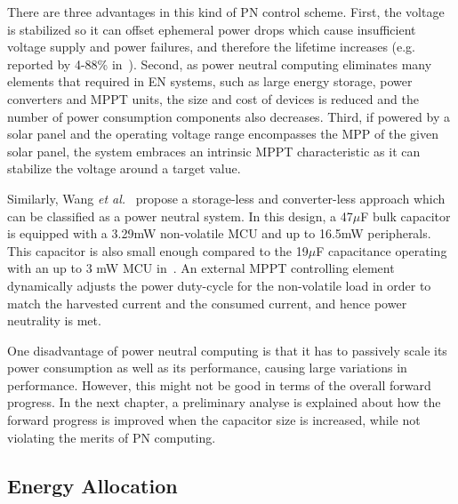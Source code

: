 There are three advantages in this kind of PN control scheme. First, the voltage is stabilized so it can offset ephemeral power drops which cause insufficient voltage supply and power failures, and therefore the lifetime increases (e.g. reported by 4-88\% in~\cite{balsamo2016graceful}). Second, as power neutral computing eliminates many elements that required in EN systems, such as large energy storage, power converters and MPPT units, the size and cost of devices is reduced and the number of power consumption components also decreases. Third, if powered by a solar panel and the operating voltage range encompasses the MPP of the given solar panel, the system embraces an intrinsic MPPT characteristic as it can stabilize the voltage around a target value.

Similarly, Wang \textit{et al.}~\cite{wang2016storage} propose a storage-less and converter-less approach which can be classified as a power neutral system. In this design, a 47$\mu$F bulk capacitor is equipped with a 3.29mW non-volatile MCU and up to 16.5mW peripherals. This capacitor is also small enough compared to the 19$\mu$F capacitance operating with an up to 3 mW MCU in~\cite{balsamo2016graceful}. An external MPPT controlling element dynamically adjusts the power duty-cycle for the non-volatile load in order to match the harvested current and the consumed current, and hence power neutrality is met. 

One disadvantage of power neutral computing is that it has to passively scale its power consumption as well as its performance, causing large variations in performance. However, this might not be good in terms of the overall forward progress. In the next chapter, a preliminary analyse is explained about how the forward progress is improved when the capacitor size is increased, while not violating the merits of PN computing. 

\subsection{Energy Allocation} \label{ssec:c2_energyallocation}


